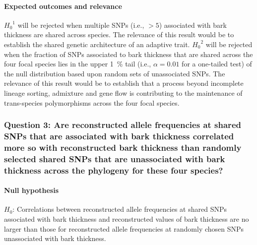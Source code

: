 \paragraph{Expected outcomes and relevance} ${H_{0}}^1$ will be rejected when multiple SNPs (i.e., $> 5$) associated 
with bark thickness are shared across species. The relevance of this result would be to establish the shared genetic 
architecture of an adaptive trait. ${H_{0}}^2$ will be rejected when the fraction of SNPs associated to bark thickness that are 
shared across the four focal species lies in the upper \SI{1}{\percent} tail (i.e., $\alpha = 0.01$ for a one-tailed test) 
of the null distribution based upon random sets of unassociated SNPs. The relevance of this result would be to 
establish that a process beyond incomplete lineage sorting, admixture and gene flow is contributing to the 
maintenance of trans-species 
polymorphisms across the four focal species. 


\subsubsection*{Question 3: Are reconstructed allele frequencies at shared SNPs that are associated with bark thickness 
correlated more so with reconstructed bark thickness than randomly selected shared SNPs that are unassociated with bark 
thickness across the phylogeny for these four species?}

\paragraph{Null hypothesis} $H_0$: Correlations between reconstructed allele frequencies at shared SNPs associated with 
bark thickness and reconstructed values of bark thickness are no larger than those for reconstructed allele frequencies at 
randomly chosen SNPs unassociated with bark thickness.

